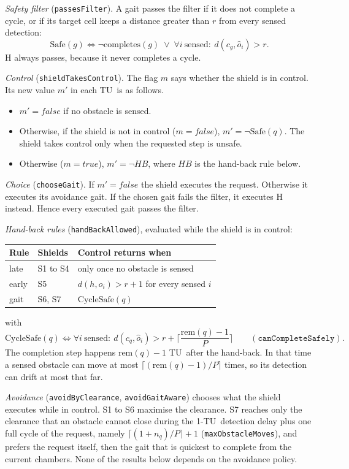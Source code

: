 \documentclass[11pt,a4paper]{article}
\theoremstyle{definition}
\newcommand{\tu}{TU}
\newcommand{\Safe}{\mathrm{Safe}}
\newcommand{\CycleSafe}{\mathrm{CycleSafe}}
\newcommand{\rem}{\mathrm{rem}}
\newcommand{\sensed}{\text{sensed}}
\begin{document}
\emph{Safety filter} (\texttt{passesFilter}). A gait passes the filter if it does not complete a cycle, or if its target cell keeps a distance greater than $r$ from every sensed detection:
\[
\Safe(g)\iff\neg\mathrm{completes}(g)\;\vee\;\forall i\ \sensed:\ d(c_g,\hat o_i)>r.
\]
H always passes, because it never completes a cycle.

\emph{Control} (\texttt{shieldTakesControl}). The flag $m$ says whether the shield is in control. Its new value $m'$ in each \tu\ is as follows.
\begin{itemize}
  \item $m'=\mathit{false}$ if no obstacle is sensed.
  \item Otherwise, if the shield is not in control ($m=\mathit{false}$), $m'=\neg\Safe(q)$. The shield takes control only when the requested step is unsafe.
  \item Otherwise ($m=\mathit{true}$), $m'=\neg HB$, where $HB$ is the hand-back rule below.
\end{itemize}

\emph{Choice} (\texttt{chooseGait}). If $m'=\mathit{false}$ the shield executes the request. Otherwise it executes its avoidance gait. If the chosen gait fails the filter, it executes H instead. Hence every executed gait passes the filter.

\emph{Hand-back rules} (\texttt{handBackAllowed}), evaluated while the shield is in control:
\begin{center}
\begin{tabular}{@{}lll@{}}
\toprule
Rule & Shields & Control returns when \\
\midrule
late & S1 to S4 & only once no obstacle is sensed \\
early & S5 & $d(h,\hat o_i)>r+1$ for every sensed $i$ \\
gait & S6, S7 & $\CycleSafe(q)$ \\
\bottomrule
\end{tabular}
\end{center}
with
\[
\CycleSafe(q)\iff\forall i\ \sensed:\ d(c_q,\hat o_i)>r+\Big\lceil\frac{\rem(q)-1}{P}\Big\rceil\qquad(\texttt{canCompleteSafely}).
\]
The completion step happens $\rem(q)-1$ \tu\ after the hand-back. In that time a sensed obstacle can move at most $\lceil(\rem(q)-1)/P\rceil$ times, so its detection can drift at most that far.

\emph{Avoidance} (\texttt{avoidByClearance}, \texttt{avoidGaitAware}) chooses what the shield executes while in control. S1 to S6 maximise the clearance. S7 reaches only the clearance that an obstacle cannot close during the 1-\tu\ detection delay plus one full cycle of the request, namely $\lceil(1+n_q)/P\rceil+1$ (\texttt{maxObstacleMoves}), and prefers the request itself, then the gait that is quickest to complete from the current chambers. None of the results below depends on the avoidance policy.
\end{document}
